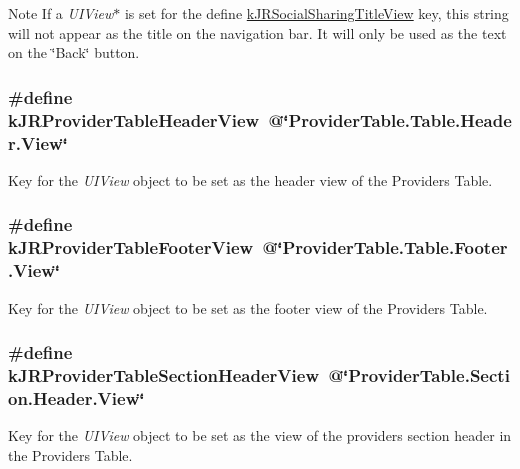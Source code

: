\begin{DoxyNote}{Note}
If a {\itshape UIView$\ast$\/} is set for the define \hyperlink{group__custom_interface_ga524965cf426f0eb9de4bcb804528c7f7}{kJRSocialSharingTitleView} key, this string will not appear as the title on the navigation bar. It will only be used as the text on the \char`\"{}Back\char`\"{} button. 
\end{DoxyNote}
\hypertarget{group__custom_interface_ga1a0f39bfdb880fdd0b8b39cbec492b6f}{
\subsubsection[{kJRProviderTableHeaderView}]{\setlength{\rightskip}{0pt plus 5cm}\#define kJRProviderTableHeaderView~@\char`\"{}ProviderTable.Table.Header.View\char`\"{}}}
\label{group__custom_interface_ga1a0f39bfdb880fdd0b8b39cbec492b6f}
Key for the {\itshape UIView\/} object to be set as the header view of the Providers Table. \hypertarget{group__custom_interface_ga2b5c9162dd7701a552147ae1607a3b4d}{
\subsubsection[{kJRProviderTableFooterView}]{\setlength{\rightskip}{0pt plus 5cm}\#define kJRProviderTableFooterView~@\char`\"{}ProviderTable.Table.Footer.View\char`\"{}}}
\label{group__custom_interface_ga2b5c9162dd7701a552147ae1607a3b4d}
Key for the {\itshape UIView\/} object to be set as the footer view of the Providers Table. \hypertarget{group__custom_interface_gaaff8ebdd2b9badb1d0a019a71d47db46}{
\subsubsection[{kJRProviderTableSectionHeaderView}]{\setlength{\rightskip}{0pt plus 5cm}\#define kJRProviderTableSectionHeaderView~@\char`\"{}ProviderTable.Section.Header.View\char`\"{}}}
\label{group__custom_interface_gaaff8ebdd2b9badb1d0a019a71d47db46}
Key for the {\itshape UIView\/} object to be set as the view of the providers section header in the Providers Table.

